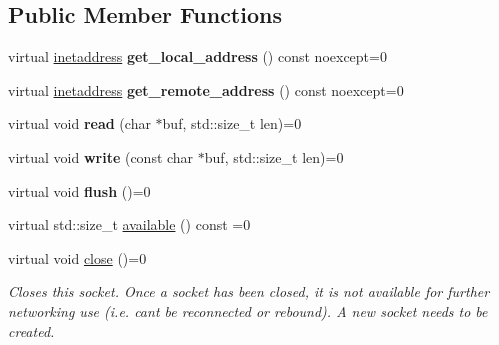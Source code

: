 \subsection*{Public Member Functions}
\begin{DoxyCompactItemize}
\item 
\mbox{\label{structdevfix_1_1net_1_1socket_aba4ce6f76a59c691454669e1fc0e8fd6}} 
virtual \hyperlink{structdevfix_1_1net_1_1inetaddress}{inetaddress} {\bfseries get\+\_\+local\+\_\+address} () const noexcept=0
\item 
\mbox{\label{structdevfix_1_1net_1_1socket_abe198b5e4a8196f9c64a07387e97a76b}} 
virtual \hyperlink{structdevfix_1_1net_1_1inetaddress}{inetaddress} {\bfseries get\+\_\+remote\+\_\+address} () const noexcept=0
\item 
\mbox{\label{structdevfix_1_1net_1_1socket_aeebcbcea382ae2bb1ee2bcba990ca997}} 
virtual void {\bfseries read} (char $\ast$buf, std\+::size\+\_\+t len)=0
\item 
\mbox{\label{structdevfix_1_1net_1_1socket_ab4901b9adf27318c7089ec907c523cd8}} 
virtual void {\bfseries write} (const char $\ast$buf, std\+::size\+\_\+t len)=0
\item 
\mbox{\label{structdevfix_1_1net_1_1socket_ab65025aff040388ea07b812f1678a712}} 
virtual void {\bfseries flush} ()=0
\item 
virtual std\+::size\+\_\+t \hyperlink{structdevfix_1_1net_1_1socket_ad4b71445fc8888f0f30766de187ce05e}{available} () const =0
\item 
\mbox{\label{structdevfix_1_1net_1_1socket_ac82979d2e68f6f740ccfb7937fcd7f67}} 
virtual void \hyperlink{structdevfix_1_1net_1_1socket_ac82979d2e68f6f740ccfb7937fcd7f67}{close} ()=0
\begin{DoxyCompactList}\small\item\em Closes this socket. Once a socket has been closed, it is not available for further networking use (i.\+e. can\textquotesingle{}t be reconnected or rebound). A new socket needs to be created. \end{DoxyCompactList}\item 

\end{DoxyCompactItemize}
